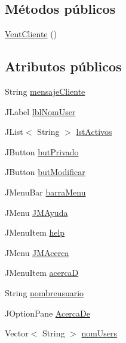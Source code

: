 \subsection*{Métodos públicos}
\begin{DoxyCompactItemize}
\item 
\hyperlink{classcom_1_1ucab_1_1javachat_1_1_cliente_1_1view_1_1_vent_cliente_a10f9a5e4dc7215b26b4f1e95280b1858}{Vent\-Cliente} ()
\end{DoxyCompactItemize}
\subsection*{Atributos públicos}
\begin{DoxyCompactItemize}
\item 
String \hyperlink{classcom_1_1ucab_1_1javachat_1_1_cliente_1_1view_1_1_vent_cliente_ace603261d388c755e279d77d83a9cccb}{mensaje\-Cliente}
\item 
J\-Label \hyperlink{classcom_1_1ucab_1_1javachat_1_1_cliente_1_1view_1_1_vent_cliente_af68f442f498fbcc6ebfaf4243f05f1dd}{lbl\-Nom\-User}
\item 
J\-List$<$ String $>$ \hyperlink{classcom_1_1ucab_1_1javachat_1_1_cliente_1_1view_1_1_vent_cliente_a63d3725a08f6ebfe73015ce9560ba462}{lst\-Activos}
\item 
J\-Button \hyperlink{classcom_1_1ucab_1_1javachat_1_1_cliente_1_1view_1_1_vent_cliente_a485c7cc6a21b05d2e515dab3077da86f}{but\-Privado}
\item 
J\-Button \hyperlink{classcom_1_1ucab_1_1javachat_1_1_cliente_1_1view_1_1_vent_cliente_a3c70efb0ed43251cc5629e0b741e3831}{but\-Modificar}
\item 
J\-Menu\-Bar \hyperlink{classcom_1_1ucab_1_1javachat_1_1_cliente_1_1view_1_1_vent_cliente_aa8b0cdf243fc9aa223a7f6c8f81ef86c}{barra\-Menu}
\item 
J\-Menu \hyperlink{classcom_1_1ucab_1_1javachat_1_1_cliente_1_1view_1_1_vent_cliente_a0c84f912b0ec20c3de8d8d498a48d00f}{J\-M\-Ayuda}
\item 
J\-Menu\-Item \hyperlink{classcom_1_1ucab_1_1javachat_1_1_cliente_1_1view_1_1_vent_cliente_a11f89017d035722b0043be1852e06ace}{help}
\item 
J\-Menu \hyperlink{classcom_1_1ucab_1_1javachat_1_1_cliente_1_1view_1_1_vent_cliente_ad30b231b7819130f9ef8749da385cbc2}{J\-M\-Acerca}
\item 
J\-Menu\-Item \hyperlink{classcom_1_1ucab_1_1javachat_1_1_cliente_1_1view_1_1_vent_cliente_aef5b2dde73418c5bd6a3979c9c05dd61}{acerca\-D}
\item 
String \hyperlink{classcom_1_1ucab_1_1javachat_1_1_cliente_1_1view_1_1_vent_cliente_ad922d8637f46a059a345c80f3d599ddc}{nombreusuario}
\item 
J\-Option\-Pane \hyperlink{classcom_1_1ucab_1_1javachat_1_1_cliente_1_1view_1_1_vent_cliente_aa5b1c55637429e4f697d736b09785113}{Acerca\-De}
\item 
Vector$<$ String $>$ \hyperlink{classcom_1_1ucab_1_1javachat_1_1_cliente_1_1view_1_1_vent_cliente_a9a84788d98e20e415acc5fbabfd3486a}{nom\-Users}
\end{DoxyCompactItemize}


